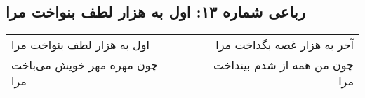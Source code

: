 \begin{center}
\section*{رباعی شماره ۱۳: اول به هزار لطف بنواخت مرا}
\label{sec:0013}
\begin{longtable}{l p{0.5cm} r}
اول به هزار لطف بنواخت مرا
&&
آخر به هزار غصه بگداخت مرا
\\
چون مهره مهر خویش می‌باخت مرا
&&
چون من همه از شدم بینداخت مرا
\\
\end{longtable}
\end{center}
